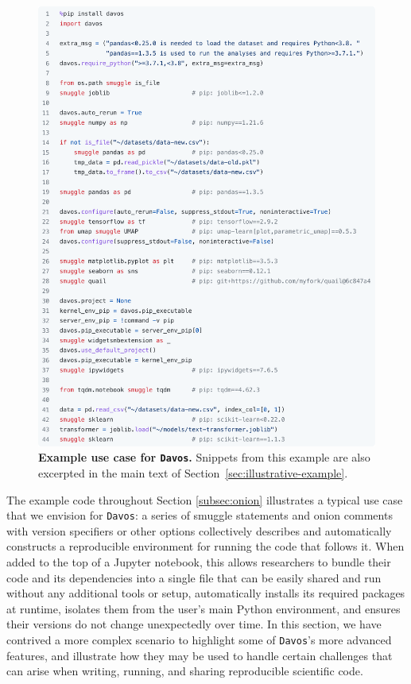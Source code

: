 \documentclass[preprint,12pt,a4paper]{elsarticle}
\begin{document}
\begin{figure}[tp]
\centering
\includegraphics[width=\textwidth]{figs/illustrative_example}
\caption{\small \textbf{Example use case for \texttt{Davos}.}
  Snippets from this example are also excerpted in the main text of
  Section~\ref{sec:illustrative-example}.}
\label{fig:illustrative-example}
\end{figure}

The example code throughout Section \ref{subsec:onion} illustrates a typical use case that we envision for \texttt{Davos}: a series of smuggle statements and onion comments with version specifiers or other options collectively describes and automatically constructs a reproducible environment for running the code that follows it.
When added to the top of a Jupyter notebook, this allows researchers to bundle their code and its dependencies into a single file that can be easily shared and run without any additional tools or setup, automatically installs its required packages at runtime, isolates them from the user's main Python environment, and ensures their versions do not change unexpectedly over time.
In this section, we have contrived a more complex scenario to highlight some of \texttt{Davos}'s more advanced features, and illustrate how they may be used to handle certain challenges that can arise when writing, running, and sharing reproducible scientific code.
\end{document}
